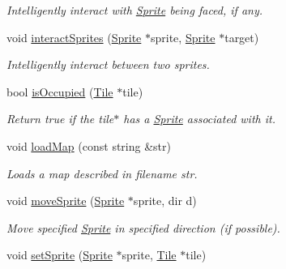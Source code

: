 \begin{DoxyCompactItemize}
\begin{DoxyCompactList}\small\item\em Intelligently interact with \hyperlink{class_sprite}{Sprite} being faced, if any. \end{DoxyCompactList}\item 
void \hyperlink{class_terr_af02d1d579ee4e18f06d6c84f370179d3}{interact\+Sprites} (\hyperlink{class_sprite}{Sprite} $\ast$sprite, \hyperlink{class_sprite}{Sprite} $\ast$target)\hypertarget{class_terr_af02d1d579ee4e18f06d6c84f370179d3}{}\label{class_terr_af02d1d579ee4e18f06d6c84f370179d3}

\begin{DoxyCompactList}\small\item\em Intelligently interact between two sprites. \end{DoxyCompactList}\item 
bool \hyperlink{class_terr_ab207b5e04cea6d9e52592786098d464a}{is\+Occupied} (\hyperlink{class_tile}{Tile} $\ast$tile)\hypertarget{class_terr_ab207b5e04cea6d9e52592786098d464a}{}\label{class_terr_ab207b5e04cea6d9e52592786098d464a}

\begin{DoxyCompactList}\small\item\em Return true if the tile$\ast$ has a \hyperlink{class_sprite}{Sprite} associated with it. \end{DoxyCompactList}\item 
void \hyperlink{class_terr_af53f4fdf0e1605b1536bde8c3fb77c9d}{load\+Map} (const string \&str)\hypertarget{class_terr_af53f4fdf0e1605b1536bde8c3fb77c9d}{}\label{class_terr_af53f4fdf0e1605b1536bde8c3fb77c9d}

\begin{DoxyCompactList}\small\item\em Loads a map described in filename str. \end{DoxyCompactList}\item 
void \hyperlink{class_terr_a1b298d5b387f2db5fe78b877d757591f}{move\+Sprite} (\hyperlink{class_sprite}{Sprite} $\ast$sprite, dir d)\hypertarget{class_terr_a1b298d5b387f2db5fe78b877d757591f}{}\label{class_terr_a1b298d5b387f2db5fe78b877d757591f}

\begin{DoxyCompactList}\small\item\em Move specified \hyperlink{class_sprite}{Sprite} in specified direction (if possible). \end{DoxyCompactList}\item 
void \hyperlink{class_terr_af750c3de5bc44381a3597b2a24895118}{set\+Sprite} (\hyperlink{class_sprite}{Sprite} $\ast$sprite, \hyperlink{class_tile}{Tile} $\ast$tile)\hypertarget{class_terr_af750c3de5bc44381a3597b2a24895118}{}\label{class_terr_af750c3de5bc44381a3597b2a24895118}


\end{DoxyCompactItemize}
